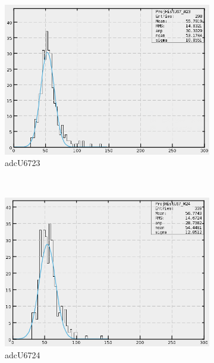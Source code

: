 \begin{figure}[h]
\begin{subfigure}[h]{0.3\textwidth}
        \includegraphics[width=\textwidth, keepaspectratio = true]{adcU67_23}
        \caption{adcU6723}
        \label{fig:adcU67_23}
    \end{subfigure}
    ~
    \begin{subfigure}[h]{0.3\textwidth}
        \centering
        \includegraphics[width=\textwidth, keepaspectratio = true]{adcU67_24}
        \caption{adcU6724}
        \label{fig:adcU67_24}
    \end{subfigure}
    ~
    \begin{subfigure}[h]{0.3\textwidth}
        \centering

\end{subfigure}
\end{figure}
